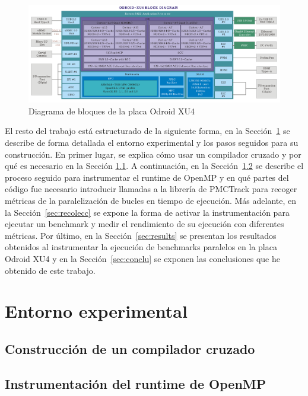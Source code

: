 \begin{figure}[tbp]
    \centering
    \includegraphics[width=1\textwidth]{diagrama_de_bloques_ODROID_XU4.png}
    \caption{Diagrama de bloques de la placa Odroid XU4}
    \label{fig:diagramaDeBloquesXU4}
\end{figure}


El resto del trabajo está estructurado de la siguiente forma, en la Sección~\ref{sec:expent} se describe de forma detallada el entorno experimental y los pasos seguidos para su construcción. En primer lugar, se explica cómo usar un compilador cruzado y por qué es necesario en la Sección \ref{sec:crucomp}. A continuación, en la Sección~\ref{sec:instrum} se describe el proceso seguido para instrumentar el runtime de OpenMP y en qué partes del código fue necesario introducir llamadas a la librería de PMCTrack para recoger métricas de la paralelización de bucles en tiempo de ejecución. Más adelante, en la Sección~\ref{sec:recolecc} se expone la forma de activar la instrumentación para ejecutar un benchmark y medir el rendimiento de su ejecución con diferentes métricas. Por último, en la Sección~\ref{sec:results} se presentan los resultados obtenidos al instrumentar la ejecución de benchmarks paralelos en la placa Odroid XU4 y en la Sección~\ref{sec:conclu} se exponen las conclusiones que he obtenido de este trabajo.

\section{Entorno experimental}\label{sec:expent}

\subsection{Construcción de un compilador cruzado}\label{sec:crucomp}

\subsection{Instrumentación del runtime de OpenMP}\label{sec:instrum}


